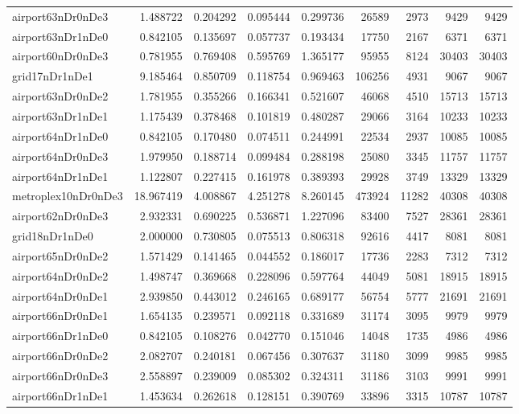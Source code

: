 \documentclass[../../../thesis.tex]{subfiles}
\begin{document}
\begin{longtable}{|l|r|r|r|r|r|r|r|r|}
airport63nDr0nDe3 & 1.488722 & 0.204292 & 0.095444 & 0.299736 & 26589 & 2973 & 9429 & 9429 \\
airport63nDr1nDe0 & 0.842105 & 0.135697 & 0.057737 & 0.193434 & 17750 & 2167 & 6371 & 6371 \\
airport60nDr0nDe3 & 0.781955 & 0.769408 & 0.595769 & 1.365177 & 95955 & 8124 & 30403 & 30403 \\
grid17nDr1nDe1 & 9.185464 & 0.850709 & 0.118754 & 0.969463 & 106256 & 4931 & 9067 & 9067 \\
airport63nDr0nDe2 & 1.781955 & 0.355266 & 0.166341 & 0.521607 & 46068 & 4510 & 15713 & 15713 \\
airport63nDr1nDe1 & 1.175439 & 0.378468 & 0.101819 & 0.480287 & 29066 & 3164 & 10233 & 10233 \\
airport64nDr1nDe0 & 0.842105 & 0.170480 & 0.074511 & 0.244991 & 22534 & 2937 & 10085 & 10085 \\
airport64nDr0nDe3 & 1.979950 & 0.188714 & 0.099484 & 0.288198 & 25080 & 3345 & 11757 & 11757 \\
airport64nDr1nDe1 & 1.122807 & 0.227415 & 0.161978 & 0.389393 & 29928 & 3749 & 13329 & 13329 \\
metroplex10nDr0nDe3 & 18.967419 & 4.008867 & 4.251278 & 8.260145 & 473924 & 11282 & 40308 & 40308 \\
airport62nDr0nDe3 & 2.932331 & 0.690225 & 0.536871 & 1.227096 & 83400 & 7527 & 28361 & 28361 \\
grid18nDr1nDe0 & 2.000000 & 0.730805 & 0.075513 & 0.806318 & 92616 & 4417 & 8081 & 8081 \\
airport65nDr0nDe2 & 1.571429 & 0.141465 & 0.044552 & 0.186017 & 17736 & 2283 & 7312 & 7312 \\
airport64nDr0nDe2 & 1.498747 & 0.369668 & 0.228096 & 0.597764 & 44049 & 5081 & 18915 & 18915 \\
airport64nDr0nDe1 & 2.939850 & 0.443012 & 0.246165 & 0.689177 & 56754 & 5777 & 21691 & 21691 \\
airport66nDr0nDe1 & 1.654135 & 0.239571 & 0.092118 & 0.331689 & 31174 & 3095 & 9979 & 9979 \\
airport66nDr1nDe0 & 0.842105 & 0.108276 & 0.042770 & 0.151046 & 14048 & 1735 & 4986 & 4986 \\
airport66nDr0nDe2 & 2.082707 & 0.240181 & 0.067456 & 0.307637 & 31180 & 3099 & 9985 & 9985 \\
airport66nDr0nDe3 & 2.558897 & 0.239009 & 0.085302 & 0.324311 & 31186 & 3103 & 9991 & 9991 \\
airport66nDr1nDe1 & 1.453634 & 0.262618 & 0.128151 & 0.390769 & 33896 & 3315 & 10787 & 10787 \\

\end{longtable}
\end{document}
